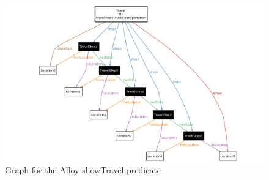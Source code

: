 \begin{figure}
	\hspace*{-2cm}
	\centering\includegraphics[scale=0.5]{Images/AlloyShowTravel2.png}
	\caption{Graph for the Alloy showTravel predicate}
\end{figure}